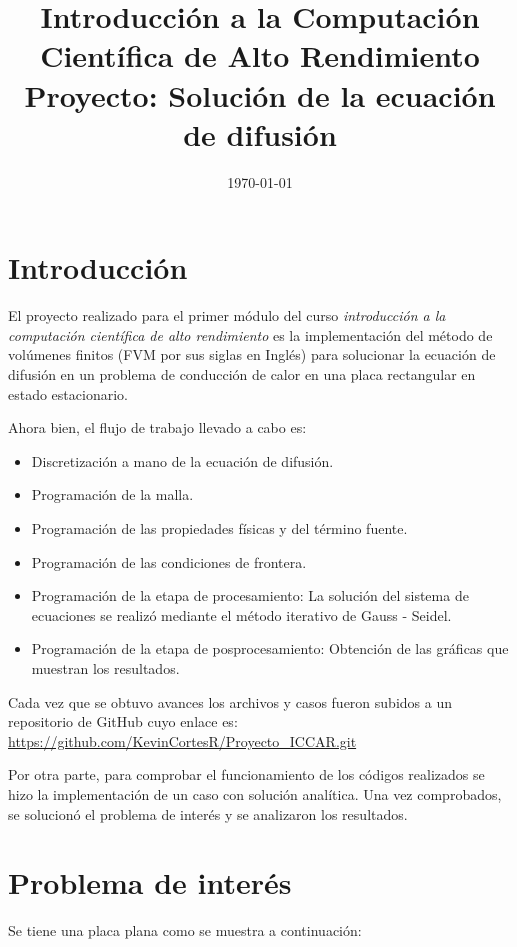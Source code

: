 \documentclass[article,latterpaper]{IEEEtran}
\title{Introducción a la Computación Científica de Alto Rendimiento\\Proyecto: Solución de la ecuación de difusión}
\author{
\IEEEauthorblockN{Kevin Steven Cortés Rincón\IEEEauthorrefmark{1}}
\IEEEauthorblockA{\textit{kcortes@unal.edu.co}\\\IEEEauthorrefmark{1}Departamento de ingeniería mecánica y mecatrónica, Universidad Nacional de Colombia, Sede Bogotá}
}
\date{\today}
\begin{document}
\maketitle

\section{Introducción}
El proyecto realizado para el primer módulo del curso \textit{introducción a la computación científica de alto rendimiento} es la implementación del método de volúmenes finitos (FVM por sus siglas en Inglés) para solucionar la ecuación de difusión en un problema de conducción de calor en una placa rectangular en estado estacionario.

Ahora bien, el flujo de trabajo llevado a cabo es:

\begin{itemize}
	\item Discretización a mano de la ecuación de difusión.
	\item Programación de la malla.
	\item Programación de las propiedades físicas y del término fuente.
	\item Programación de las condiciones de frontera.
	\item Programación de la etapa de procesamiento: La solución del sistema de ecuaciones se realizó mediante el método iterativo de Gauss - Seidel.
	\item Programación de la etapa de posprocesamiento: Obtención de las gráficas que muestran los resultados.
\end{itemize}

Cada vez que se obtuvo avances los archivos y casos fueron subidos a un repositorio de GitHub cuyo enlace es: \url{https://github.com/KevinCortesR/Proyecto_ICCAR.git}

\vspace{1.5 cm}

Por otra parte, para comprobar el funcionamiento de los códigos realizados se hizo la implementación de un caso con solución analítica. Una vez comprobados, se solucionó el problema de interés y se analizaron los resultados.

\section{Problema de interés}
Se tiene una placa plana como se muestra a continuación:
\end{document}
